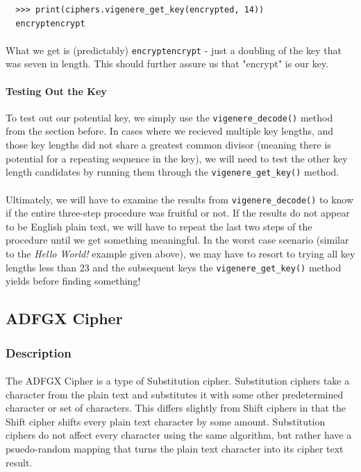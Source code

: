 \documentclass[12pt,a4paper]{article}
\begin{document}
\begin{verbatim}
  >>> print(ciphers.vigenere_get_key(encrypted, 14)) 
  encryptencrypt
\end{verbatim}

\paragraph{}
What we get is (predictably) \verb|encryptencrypt| - just a doubling of the key that 
was seven in length.  This should further assure us that "encrypt" is our key.

\paragraph{Testing Out the Key}
To test out our potential key, we simply use the \verb|vigenere_decode()| 
method from the section before.  In cases where we recieved multiple key lengths, and 
those key lengths did not share a greatest common divisor (meaning there is potential 
for a repeating sequence in the key), we will need to test the other key length 
candidates by running them through the \verb|vigenere_get_key()| method.

\paragraph{}
Ultimately, we will have to examine the results from \verb|vigenere_decode()| 
to know if the entire three-step procedure was fruitful or not.  If the results 
do not appear to be English plain text, we will have to repeat the last two 
steps of the procedure until we get something meaningful.  In the worst case 
scenario (similar to the \textit{Hello World!} example given above), we may have 
to resort to trying all key lengths less than 23 and the subsequent keys the 
\verb|vigenere_get_key()| method yields before finding something!


\subsection{ADFGX Cipher}
\subsubsection{Description}
\paragraph{}
The ADFGX Cipher is a type of Substitution cipher.  Substitution ciphers take 
a character from the plain text and substitutes it with some other predetermined 
character or set of characters.  This differs slightly from Shift ciphers in 
that the Shift cipher shifts every plain text character by some amount.  
Substitution ciphers do not affect every character using the same algorithm, 
but rather have a psuedo-random mapping that turns the plain text character 
into its cipher text result.
\end{document}

